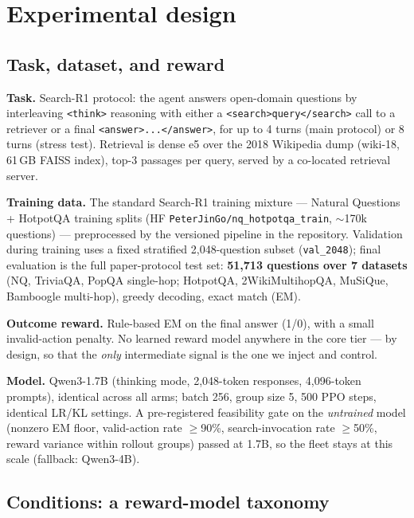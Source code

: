 \documentclass[11pt,a4paper]{article}
\begin{document}
\section{Experimental design}

\subsection{Task, dataset, and reward}

\textbf{Task.} Search-R1 protocol: the agent answers open-domain questions by interleaving
\texttt{<think>} reasoning with either a \texttt{<search>query</search>} call to a retriever or
a final \texttt{<answer>...</answer>}, for up to 4 turns (main protocol) or 8 turns (stress
test). Retrieval is dense e5 over the 2018 Wikipedia dump (wiki-18, 61\,GB FAISS index), top-3
passages per query, served by a co-located retrieval server.

\textbf{Training data.} The standard Search-R1 training mixture --- Natural Questions +
HotpotQA training splits (HF \texttt{PeterJinGo/nq\_hotpotqa\_train}, $\sim$170k questions) ---
preprocessed by the versioned pipeline in the repository. Validation during training uses a
fixed stratified 2{,}048-question subset (\texttt{val\_2048}); final evaluation is the full
paper-protocol test set: \textbf{51{,}713 questions over 7 datasets} (NQ, TriviaQA, PopQA
single-hop; HotpotQA, 2WikiMultihopQA, MuSiQue, Bamboogle multi-hop), greedy decoding, exact
match (EM).

\textbf{Outcome reward.} Rule-based EM on the final answer (1/0), with a small invalid-action
penalty. No learned reward model anywhere in the core tier --- by design, so that the
\emph{only} intermediate signal is the one we inject and control.

\textbf{Model.} Qwen3-1.7B (thinking mode, 2{,}048-token responses, 4{,}096-token prompts),
identical across all arms; batch 256, group size 5, 500 PPO steps, identical LR/KL settings.
A pre-registered feasibility gate on the \emph{untrained} model (nonzero EM floor, valid-action
rate $\geq$90\%, search-invocation rate $\geq$50\%, reward variance within rollout groups)
passed at 1.7B, so the fleet stays at this scale (fallback: Qwen3-4B).

\subsection{Conditions: a reward-model taxonomy}
\end{document}
